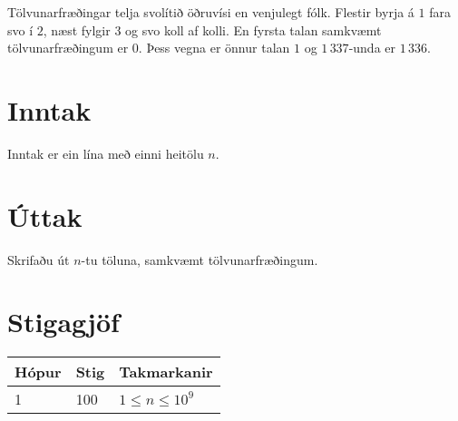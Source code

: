 
Tölvunarfræðingar telja svolítið öðruvísi en venjulegt fólk.
Flestir byrja á $1$ fara svo í $2$, næst fylgir $3$ og svo koll af kolli.
En fyrsta talan samkvæmt tölvunarfræðingum er $0$.
Þess vegna er önnur talan $1$ og $1\,337$-unda er $1\,336$.

\section*{Inntak}
Inntak er ein lína með einni heitölu $n$.

\section*{Úttak}
Skrifaðu út $n$-tu töluna, samkvæmt tölvunarfræðingum.

\section*{Stigagjöf}
\begin{tabular}{|l|l|l|}
\hline
Hópur & Stig & Takmarkanir \\ \hline
1     & 100  & $1 \leq n \leq 10^9$ \\ \hline
\end{tabular}

